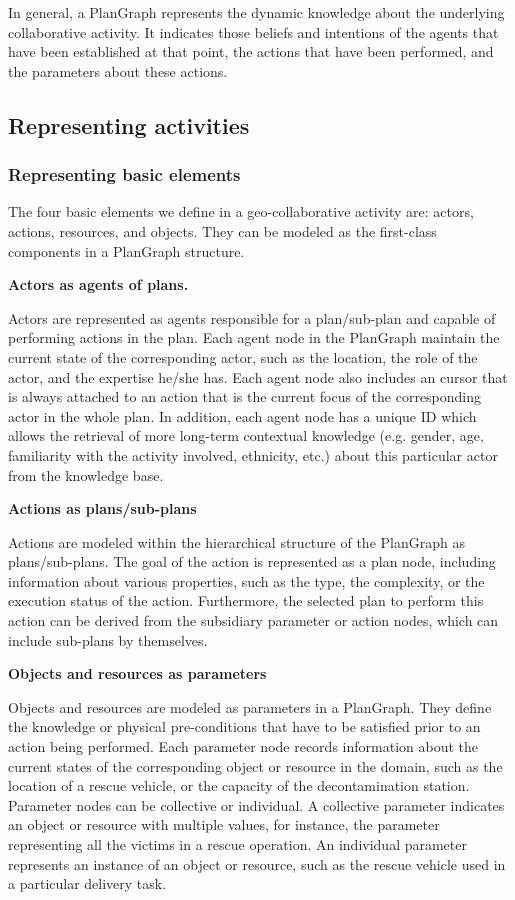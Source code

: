 In general, a PlanGraph represents the dynamic knowledge about the underlying collaborative activity. It indicates those beliefs and intentions of the agents that have been established at that point, the actions that have been performed, and the parameters about these actions. 

\subsection{Representing activities} %
\label{sub:representing_activities}

\subsubsection{Representing basic elements} %
\label{ssub:representing_basic_elements_of_a_collaborative_activity}
The four basic elements we define in a geo-collaborative activity are: actors, actions, resources, and objects. They can be modeled as the first-class components in a PlanGraph structure. 

\textbf{Actors as agents of plans.}

Actors are represented as agents responsible for a plan/sub-plan and capable of performing actions in the plan. Each agent node in the PlanGraph maintain the current state of the corresponding actor, such as the location, the role of the actor, and the expertise he/she has. Each agent node also includes an cursor that is always attached to an action that is the current focus of the corresponding actor in the whole plan. In addition, each agent node has a unique ID which allows the retrieval of more long-term contextual knowledge (e.g. gender, age, familiarity with the activity involved, ethnicity, etc.) about this particular actor from the knowledge base.

\textbf{Actions as plans/sub-plans}

Actions are modeled within the hierarchical structure of the PlanGraph as plans/sub-plans. The goal of the action is represented as a plan node, including information about various properties, such as the type, the complexity, or the execution status of the action. Furthermore, the selected plan to perform this action can be derived from the subsidiary parameter or action nodes, which can include sub-plans by themselves. 

\textbf{Objects and resources as parameters}

Objects and resources are modeled as parameters in a PlanGraph. They define the knowledge or physical pre-conditions that have to be satisfied prior to an action being performed. Each parameter node records information about the current states of the corresponding object or resource in the domain, such as the location of a rescue vehicle, or the capacity of the decontamination station. Parameter nodes can be collective or individual. A collective parameter indicates an object or resource with multiple values, for instance, the parameter representing all the victims in a rescue operation. An individual parameter represents an instance of an object or resource, such as the rescue vehicle used in a particular delivery task. 

